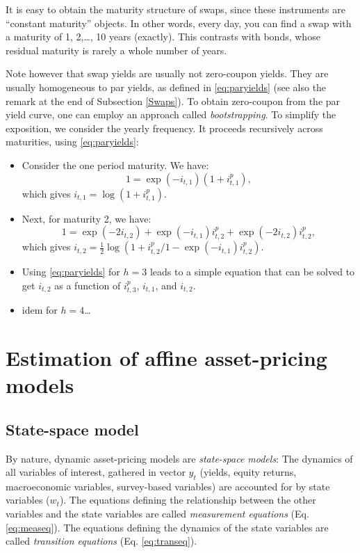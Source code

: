 \documentclass[
  12pt,
]{book}
\providecommand{\tightlist}{%
  \setlength{\itemsep}{0pt}\setlength{\parskip}{0pt}}
\theoremstyle{definition}
\theoremstyle{definition}
\theoremstyle{definition}
\theoremstyle{definition}
\theoremstyle{remark}
\begin{document}
It is easy to obtain the maturity structure of swaps, since these instruments are ``constant maturity'' objects. In other words, every day, you can find a swap with a maturity of 1, 2,\ldots, 10 years (exactly). This contrasts with bonds, whose residual maturity is rarely a whole number of years.

Note however that swap yields are usually not zero-coupon yields. They are usually homogeneous to par yields, as defined in \eqref{eq:paryields} (see also the remark at the end of Subsection \ref{Swaps}). To obtain zero-coupon from the par yield curve, one can employ an approach called \emph{bootstrapping}. To simplify the exposition, we consider the yearly frequency. It proceeds recursively across maturities, using \eqref{eq:paryields}:

\begin{itemize}
\tightlist
\item
  Consider the one period maturity. We have:
  \[
  1 = \exp(-i_{t,1})(1 + i_{t,1}^p),
  \]
  which gives \(i_{t,1} = \log(1+i_{t,1}^p)\).
\item
  Next, for maturity 2, we have:
  \[
  1 = \exp(-2i_{t,2}) + \exp(-i_{t,1})i_{t,2}^p + \exp(-2i_{t,2})i_{t,2}^p,
  \]
  which gives \(i_{t,2} = \frac{1}{2}\log\left(1 + i_{t,2}^p \big/ 1 - \exp(-i_{t,1})i_{t,2}^p\right)\).
\item
  Using \eqref{eq:paryields} for \(h=3\) leads to a simple equation that can be solved to get \(i_{t,2}\) as a function of \(i_{t,3}^p\), \(i_{t,1}\), and \(i_{t,2}\).
\item
  idem for \(h=4\)\ldots{}
\end{itemize}

\hypertarget{Estimation}{%
\chapter{Estimation of affine asset-pricing models}\label{Estimation}}

\hypertarget{EstimationSSModel}{%
\section{State-space model}\label{EstimationSSModel}}

By nature, dynamic asset-pricing models are \emph{state-space models}: The dynamics of all variables of interest, gathered in vector \(y_t\) (yields, equity returns, macroeconomic variables, survey-based variables) are accounted for by state variables (\(w_t\)). The equations defining the relationship between the other variables and the state variables are called \emph{measurement equations} (Eq. \eqref{eq:measeq}). The equations defining the dynamics of the state variables are called \emph{transition equations} (Eq. \eqref{eq:transeq}).
\end{document}
